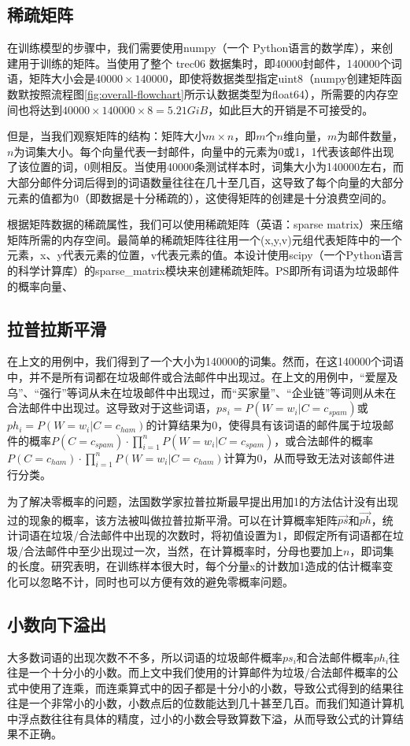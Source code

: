 \documentclass[UTF8,zihao=-4]{ctexart}
\newcommand{\upcite}[1]{\textsuperscript{\cite{#1}}}
\begin{document}
\subsection{稀疏矩阵}
	在训练模型的步骤中，我们需要使用numpy（一个 Python语言的数学库），来创建用于训练的矩阵。当使用了整个 trec06 数据集时，即40000封邮件，140000个词语，矩阵大小会是$40000\times140000$，即使将数据类型指定uint8（numpy创建矩阵函数默按照流程图\ref{fig:overall-flowchart}所示认数据类型为float64），所需要的内存空间也将达到$40000\times140000\times8=5.21GiB$，如此巨大的开销是不可接受的。
	
	但是，当我们观察矩阵的结构：矩阵大小$m\times n$，即$m$个$n$维向量，$m$为邮件数量，$n$为词集大小。每个向量代表一封邮件，向量中的元素为0或1，1代表该邮件出现了该位置的词，0则相反。当使用40000条测试样本时，词集大小为140000左右，而大部分邮件分词后得到的词语数量往往在几十至几百，这导致了每个向量的大部分元素的值都为0（即数据是十分稀疏的），这使得矩阵的创建是十分浪费空间的。
	
	根据矩阵数据的稀疏属性，我们可以使用稀疏矩阵（英语：sparse matrix）来压缩矩阵所需的内存空间。最简单的稀疏矩阵往往用一个(x,y,v)元组代表矩阵中的一个元素，x、y代表元素的位置，v代表元素的值。本设计使用scipy（一个Python语言的科学计算库）的sparse\_matrix模块来创建稀疏矩阵。PS即所有词语为垃圾邮件的概率向量、
\subsection{拉普拉斯平滑}
	在上文的用例中，我们得到了一个大小为140000的词集。然而，在这140000个词语中，并不是所有词都在垃圾邮件或合法邮件中出现过。在上文的用例中，“爱屋及乌”、“强行”等词从未在垃圾邮件中出现过，而“买家量”、“企业链”等词则从未在合法邮件中出现过。这导致对于这些词语，$ps_i=P(W=w_i|C=c_{spam})$或$ph_i=P(W=w_i|C=c_{ham})$的计算结果为0，使得具有该词语的邮件属于垃圾邮件的概率$P(C=c_{spam}) \cdot \prod\limits_{i=1}^{n} P(W=w_i|C=c_{spam})$，或合法邮件的概率$P(C=c_{ham}) \cdot \prod\limits_{i=1}^{n} P(W=w_i|C=c_{ham})$计算为0，从而导致无法对该邮件进行分类。
	
	为了解决零概率的问题，法国数学家拉普拉斯最早提出用加1的方法估计没有出现过的现象的概率，该方法被叫做拉普拉斯平滑\upcite{nb-enhance}。可以在计算概率矩阵$\vec{ps}$和$\vec{ph}$，统计词语在垃圾/合法邮件中出现的次数时，将初值设置为1，即假定所有词语都在垃圾/合法邮件中至少出现过一次，当然，在计算概率时，分母也要加上$n$，即词集的长度。研究表明，在训练样本很大时，每个分量x的计数加1造成的估计概率变化可以忽略不计，同时也可以方便有效的避免零概率问题。
\subsection{小数向下溢出}
	大多数词语的出现次数不不多，所以词语的垃圾邮件概率$ps_i$和合法邮件概率$ph_i$往往是一个十分小的小数。而上文中我们使用的计算邮件为垃圾/合法邮件概率的公式中使用了连乘，而连乘算式中的因子都是十分小的小数，导致公式得到的结果往往是一个非常小的小数，小数点后的位数能达到几十甚至几百。而我们知道计算机中浮点数往往有具体的精度，过小的小数会导致算数下溢，从而导致公式的计算结果不正确。
	
\end{document}
